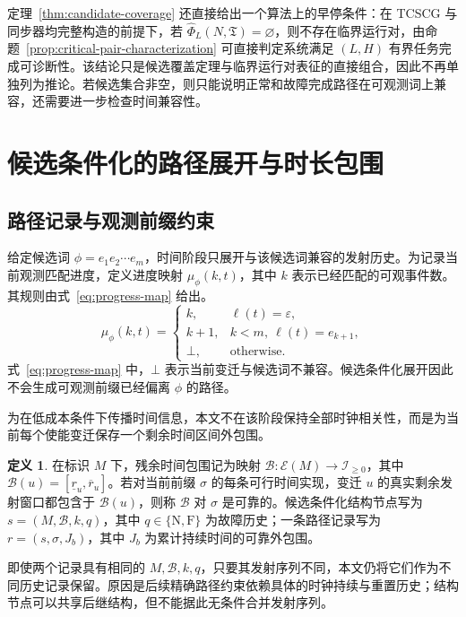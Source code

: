 \documentclass[master,fontset=ubuntu]{shnuthesis}
\theoremstyle{definition}
\newtheorem{thesisdefinition}{定义}
\begin{document}
定理~\ref{thm:candidate-coverage} 还直接给出一个算法上的早停条件：在 TCSCG 与同步器均完整构造的前提下，若 \(\widehat\Phi_L(N,\mathfrak T)=\varnothing\)，则不存在临界运行对，由命题~\ref{prop:critical-pair-characterization} 可直接判定系统满足 \((L,H)\) 有界任务完成可诊断性。该结论只是候选覆盖定理与临界运行对表征的直接组合，因此不再单独列为推论。若候选集合非空，则只能说明正常和故障完成路径在可观测词上兼容，还需要进一步检查时间兼容性。

\section{候选条件化的路径展开与时长包围}

\subsection{路径记录与观测前缀约束}

给定候选词 \(\phi=e_1e_2\cdots e_m\)，时间阶段只展开与该候选词兼容的发射历史。为记录当前观测匹配进度，定义进度映射 \(\mu_\phi(k,t)\)，其中 \(k\) 表示已经匹配的可观事件数。其规则由式~\eqref{eq:progress-map} 给出。
\begin{equation}
\mu_\phi(k,t)
=
\begin{cases}
k, & \ell(t)=\varepsilon,\\
k+1, & k<m,\ \ell(t)=e_{k+1},\\
\bot, & \mathrm{otherwise}.
\end{cases}
\label{eq:progress-map}
\end{equation}
式~\eqref{eq:progress-map} 中，\(\bot\) 表示当前变迁与候选词不兼容。候选条件化展开因此不会生成可观测前缀已经偏离 \(\phi\) 的路径。

为在低成本条件下传播时间信息，本文不在该阶段保持全部时钟相关性，而是为当前每个使能变迁保存一个剩余时间区间外包围。

\begin{thesisdefinition}
\label{def:path-record}
在标识 \(M\) 下，残余时间包围记为映射 \(\mathcal B:\mathcal E(M)\rightarrow\mathcal I_{\geq0}\)，其中 \(\mathcal B(u)=[\underline r_u,\overline r_u]\)。若对当前前缀 \(\sigma\) 的每条可行时间实现，变迁 \(u\) 的真实剩余发射窗口都包含于 \(\mathcal B(u)\)，则称 \(\mathcal B\) 对 \(\sigma\) 是可靠的。候选条件化结构节点写为 \(s=(M,\mathcal B,k,q)\)，其中 \(q\in\{\mathrm N,\mathrm F\}\) 为故障历史；一条路径记录写为 \(r=(s,\sigma,J_b)\)，其中 \(J_b\) 为累计持续时间的可靠外包围。
\end{thesisdefinition}

即使两个记录具有相同的 \(M,\mathcal B,k,q\)，只要其发射序列不同，本文仍将它们作为不同历史记录保留。原因是后续精确路径约束依赖具体的时钟持续与重置历史；结构节点可以共享后继结构，但不能据此无条件合并发射序列。
\end{document}
